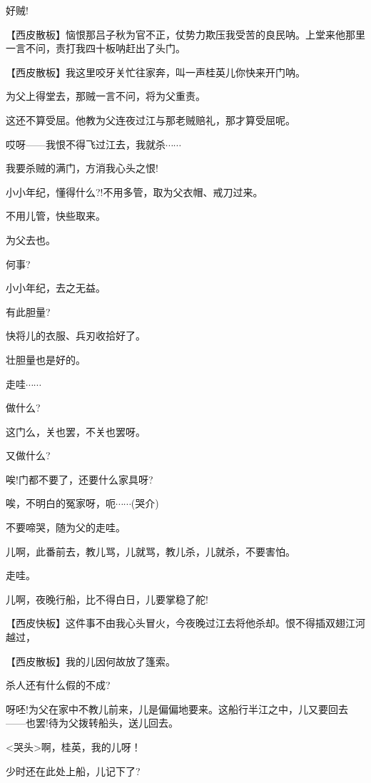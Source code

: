 {好贼!}

\setlength{\hangindent}{60pt} {【{\akai 西皮散板}】恼恨那吕子秋为官不正，仗势力欺压我受苦的良民呐。上堂来他那里一言不问，责打我四十板呐赶出了头门。}

\setlength{\hangindent}{60pt} {【{\akai 西皮散板}】我这里咬牙关忙往家奔，叫一声桂英儿你快来开门呐。}

{为父上得堂去，那贼一言不问，将为父重责。}

{这还不算受屈。他教为父连夜过江与那老贼赔礼，那才算受屈呢。}

{哎呀------我恨不得飞过江去，我就杀$\cdots{}\cdots{}$}

{我要杀贼的满门，方消我心头之恨!}

{小小年纪，懂得什么?!不用多管，取为父衣帽、戒刀过来。}

{不用儿管，快些取来。}

{为父去也。}

{何事?}

{小小年纪，去之无益。}

{有此胆量?}

{快将儿的衣服、兵刃收拾好了。}

{壮胆量也是好的。}

{走哇$\cdots{}\cdots{}$}

{做什么?}

{这门么，关也罢，不关也罢呀。}

{又做什么?}

{唉!门都不要了，还要什么家具呀?}

{唉，不明白的冤家呀，呃$\cdots{}\cdots{}$(哭介)}

{不要啼哭，随为父的走哇。}

{儿啊，此番前去，教儿骂，儿就骂，教儿杀，儿就杀，不要害怕。}

{走哇。}

{儿啊，夜晚行船，比不得白日，儿要掌稳了舵!}

\setlength{\hangindent}{60pt} {【{\akai 西皮快板}】这件事不由我心头冒火，今夜晚过江去将他杀却。恨不得插双翅江河越过，}

\setlength{\hangindent}{60pt} {【{\akai 西皮散板}】我的儿因何故放了篷索。}

{杀人还有什么假的不成?}

{呀呸!为父在家中不教儿前来，儿是偏偏地要来。这船行半江之中，儿又要回去------也罢!待为父拨转船头，送儿回去。}

{\textless{}哭头\textgreater{}啊，桂英，我的儿呀！}

{少时还在此处上船，儿记下了?}

